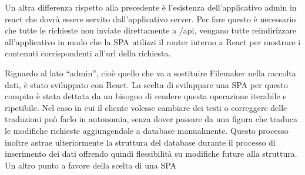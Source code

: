 Un altra differenza rispetto alla precedente è l’esistenza dell’applicativo admin in react che dovrà essere servito dall’applicativo server. Per fare questo è necessario che tutte le richieste non inviate direttamente a /api, vengano tutte reindirizzare all’applicativo in modo che la SPA utilizzi il router interno a React per mostrare i contenuti corrispondenti all’url della richiesta.\vspace{5mm}

Riguardo al lato “admin”, cioè quello che va a sostituire Filemaker nella raccolta dati, è stato sviluppato con React. La scelta di sviluppare una SPA\cite{SPA} per questo compito è stata dettata da un bisogno di rendere questa operazione iterabile e ripetibile. Nel caso in cui il cliente volesse cambiare dei testi o correggere delle traduzioni può farlo in autonomia, senza dover passare da una figura che traduca le modifiche richieste aggiungendole a database manualmente. Questo processo inoltre astrae ulteriormente la struttura del database durante il processo di inserimento dei dati offrendo quindi flessibilità su modifiche future alla struttura. Un altro punto a favore della scelta di una SPA \vspace{5mm}

